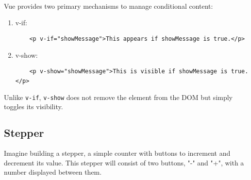 Vue provides two primary mechanisms to manage conditional content:
\begin{enumerate}
    \item v-if:
    \begin{verbatim}
    <p v-if="showMessage">This appears if showMessage is true.</p>
    \end{verbatim}
    \item v-show:
    \begin{verbatim}
    <p v-show="showMessage">This is visible if showMessage is true.</p>
    \end{verbatim}
\end{enumerate}
Unlike \texttt{v-if}, \texttt{v-show} does not remove the element from the DOM but simply toggles its visibility.

\subsection*{Stepper}
Imagine building a stepper, a simple counter with buttons to increment and decrement its value. This stepper will consist of two buttons, "-" and "+", with a number displayed between them.

